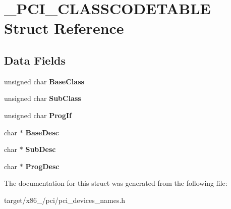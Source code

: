 \hypertarget{struct__PCI__CLASSCODETABLE}{}\section{\+\_\+\+P\+C\+I\+\_\+\+C\+L\+A\+S\+S\+C\+O\+D\+E\+T\+A\+B\+LE Struct Reference}
\label{struct__PCI__CLASSCODETABLE}
\subsection*{Data Fields}
\begin{DoxyCompactItemize}
\item 
unsigned char {\bfseries Base\+Class}\hypertarget{struct__PCI__CLASSCODETABLE_a7a19960d9dbafb954b58363498d7f738}{}\label{struct__PCI__CLASSCODETABLE_a7a19960d9dbafb954b58363498d7f738}

\item 
unsigned char {\bfseries Sub\+Class}\hypertarget{struct__PCI__CLASSCODETABLE_afefd8246fde2dfbce05dd0bd79f2bf28}{}\label{struct__PCI__CLASSCODETABLE_afefd8246fde2dfbce05dd0bd79f2bf28}

\item 
unsigned char {\bfseries Prog\+If}\hypertarget{struct__PCI__CLASSCODETABLE_abc5ea223e3a634dfd00f40c5f3bede92}{}\label{struct__PCI__CLASSCODETABLE_abc5ea223e3a634dfd00f40c5f3bede92}

\item 
char $\ast$ {\bfseries Base\+Desc}\hypertarget{struct__PCI__CLASSCODETABLE_aa53fd157555bedd43d415f545934bec4}{}\label{struct__PCI__CLASSCODETABLE_aa53fd157555bedd43d415f545934bec4}

\item 
char $\ast$ {\bfseries Sub\+Desc}\hypertarget{struct__PCI__CLASSCODETABLE_af828a1849646add7d100e2477b32cd9d}{}\label{struct__PCI__CLASSCODETABLE_af828a1849646add7d100e2477b32cd9d}

\item 
char $\ast$ {\bfseries Prog\+Desc}\hypertarget{struct__PCI__CLASSCODETABLE_ad3cefd8369eda55eea21610501191a7f}{}\label{struct__PCI__CLASSCODETABLE_ad3cefd8369eda55eea21610501191a7f}

\end{DoxyCompactItemize}


The documentation for this struct was generated from the following file\+:\begin{DoxyCompactItemize}
\item 
target/x86\+\_/pci/pci\+\_\+devices\+\_\+names.\+h\end{DoxyCompactItemize}
